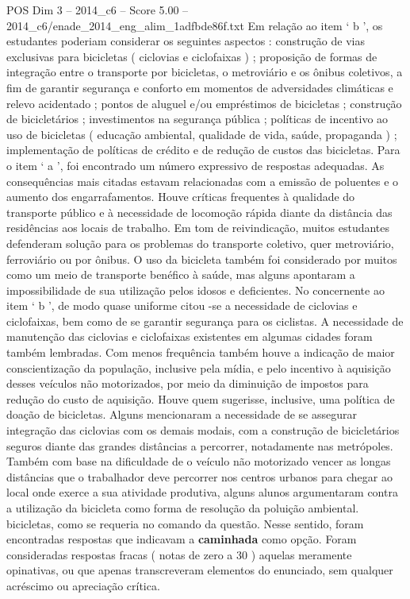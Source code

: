\begin{textsample}{POS Dim 3 – 2014\_c6 – Score 5.00 – 2014\_c6/enade\_2014\_eng\_alim\_1adfbde86f.txt}
Em relação ao item ‘ b ’, os estudantes poderiam considerar os seguintes aspectos : construção de vias exclusivas para bicicletas ( ciclovias e ciclofaixas ) ; proposição de formas de integração entre o transporte por bicicletas, o metroviário e os ônibus coletivos, a fim de garantir segurança e conforto em momentos de adversidades climáticas e relevo acidentado ; pontos de aluguel e/ou empréstimos de bicicletas ; construção de bicicletários ; investimentos na segurança pública ; políticas de incentivo ao uso de bicicletas ( educação ambiental, qualidade de vida, saúde, propaganda ) ; implementação de políticas de crédito e de redução de custos das bicicletas.
Para o item ‘ a ’, foi encontrado um número expressivo de respostas adequadas.
As consequências mais citadas estavam relacionadas com a emissão de poluentes e o aumento dos engarrafamentos.
Houve críticas frequentes à qualidade do transporte público e à necessidade de locomoção rápida diante da distância das residências aos locais de trabalho.
Em tom de reivindicação, muitos estudantes defenderam solução para os problemas do transporte coletivo, quer metroviário, ferroviário ou por ônibus.
O uso da bicicleta também foi considerado por muitos como um meio de transporte benéfico à saúde, mas alguns apontaram a impossibilidade de sua utilização pelos idosos e deficientes.
No concernente ao item ‘ b ’, de modo quase uniforme citou -se a necessidade de ciclovias e ciclofaixas, bem como de se garantir segurança para os ciclistas.
A necessidade de manutenção das ciclovias e ciclofaixas existentes em algumas cidades foram também lembradas.
Com menos frequência também houve a indicação de maior conscientização da população, inclusive pela mídia, e pelo incentivo à aquisição desses veículos não motorizados, por meio da diminuição de impostos para redução do custo de aquisição.
Houve quem sugerisse, inclusive, uma política de doação de bicicletas.
Alguns mencionaram a necessidade de se assegurar integração das ciclovias com os demais modais, com a construção de bicicletários seguros diante das grandes distâncias a percorrer, notadamente nas metrópoles.
Também com base na dificuldade de o veículo não motorizado vencer as longas distâncias que o trabalhador deve percorrer nos centros urbanos para chegar ao local onde exerce a sua atividade produtiva, alguns alunos argumentaram contra a utilização da bicicleta como forma de resolução da poluição ambiental. bicicletas, como se requeria no comando da questão.
Nesse sentido, foram encontradas respostas que indicavam a \textbf{caminhada} como opção.
Foram consideradas respostas fracas ( notas de zero a 30 ) aquelas meramente opinativas, ou que apenas transcreveram elementos do enunciado, sem qualquer acréscimo ou apreciação crítica.

\end{textsample}
